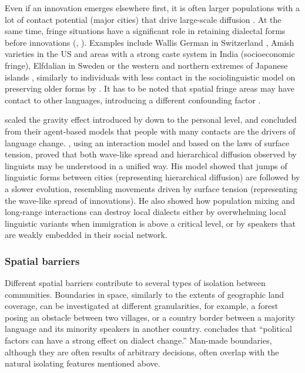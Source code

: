 \documentclass[output=paper]{langscibook}
\begin{document}
Even if an innovation emerges elsewhere first, it is often larger populations with a lot of contact potential (major cities) that drive large-scale diffusion \parencite[][622--625]{Britain2002}. At the same time, fringe situations have a significant role in retaining dialectal forms before innovations (\cite[][349]{Manczak.1988}, \cite{Schreier2009}). Examples include Wallis German in Switzerland \parencite[topographic fringe: isolated by mountains from other dialects, cf.][39]{Moulton.1941}, Amish varieties in the US \parencite[e.g.,][818--821]{Louden2020} and areas with a strong caste system in India (socioeconomic fringe), Elfdalian in Sweden \parencite[economic fringe, see][]{Sapir.2005} or the western and northern extremes of Japanese islands \parencite[geographic fringe, see][]{Abe2018}, similarly to individuals with less contact in the sociolinguistic model on preserving older forms by \citet{Fagyal2010}. It has to be noted that spatial fringe areas may have contact to other languages, introducing a different confounding factor \parencite{Steiner2021}.

\textcite{Fagyal2010} scaled the gravity effect introduced by \textcite{Trudgill1974} down to the personal level, and concluded from their agent-based models that people with many contacts are the drivers of language change. \textcite[][]{Burridge2018}, using an interaction model and based on the laws of surface tension, proved that both wave-like spread and hierarchical diffusion observed by linguists may be understood in a unified way. His  model showed that jumps of linguistic forms between cities (representing hierarchical diffusion)  are followed by a slower evolution, resembling movements driven by surface tension (representing the wave-like spread of innovations). He also showed how population mixing and long-range interactions can destroy local dialects either by overwhelming local linguistic variants when immigration is above a critical level, or by speakers that are weakly embedded in their social network.


\subsubsection{Spatial barriers}

Different spatial barriers contribute to several types of isolation between communities. Boundaries in space, similarly to the extents of geographic land coverage, can be investigated at different granularities, for example, a forest posing an obstacle between two villages, or a  country border between a majority language and its minority speakers in another country. \textcite[][63]{Gerritsen1999} concludes that “political factors can have a strong effect on dialect change.” 
Man-made boundaries, although they are often results of arbitrary decisions, often overlap with the natural isolating features mentioned above. 
\end{document}
